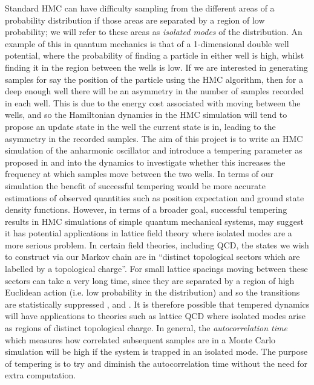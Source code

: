 \documentclass[12pt]{article}
\begin{document}
 Standard HMC can have difficulty sampling from the different areas of a probability distribution if those areas are separated by a region of low probability; we will refer to these areas as \textit{isolated modes} of the distribution. An example of this in quantum mechanics is that of a 1-dimensional double well potential, where the probability of finding a particle in either well is high, whilst finding it in the region between the wells is low. If we are interested in generating samples for say the position of the particle using the HMC algorithm, then for a deep enough well there will be an asymmetry in the number of samples recorded in each well. This is due to the energy cost associated with moving between the wells, and so the Hamiltonian dynamics in the HMC simulation will tend to propose an update state in the well the current state is in, leading to the asymmetry in the recorded samples. The aim of this project is to write an HMC simulation of the anharmonic oscillator and introduce a tempering parameter as proposed in \cite{neal_2011} and \cite{neal_1996_b} into the dynamics to investigate whether this increases the frequency at which samples move between the two wells. In terms of our simulation the benefit of successful tempering would be more accurate estimations of observed quantities such as position expectation and ground state density functions. However, in terms of a broader goal, successful tempering results in HMC simulations of simple quantum mechanical systems, may suggest it has potential applications in lattice field theory where isolated modes are a more serious problem. In certain field theories, including QCD, the states we wish to construct via our Markov chain are in ``distinct topological sectors which are labelled by a topological charge''\cite{bietenholz_2016}. For small lattice spacings moving between these sectors can take a very long time, since they are separated by a region of high Euclidean action (i.e. low probability in the distribution) and so the transitions are statistically suppressed \cite{bietenholz_2016}, \cite{debbio_panagopoulos_vicari_2002} and \cite{debbio_manca_vicari_2004}. It is therefore possible that tempered dynamics will have applications to theories such as lattice QCD where isolated modes arise as regions of distinct topological charge. In general, the \textit{autocorrelation time} which measures how correlated subsequent samples are in a Monte Carlo simulation will be high if the system is trapped in an isolated mode. The purpose of tempering is to try and diminish the autocorrelation time without the need for extra computation. 
\end{document}
